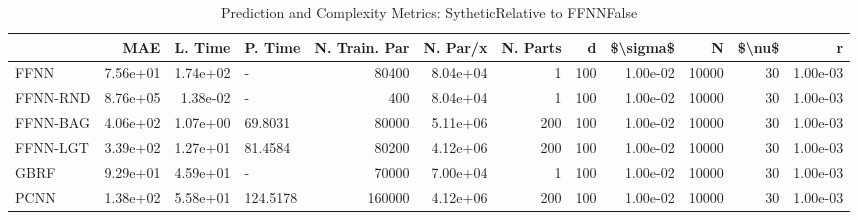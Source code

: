 \begin{table}
\centering
\caption{Prediction and Complexity Metrics: SytheticRelative to FFNNFalse}
\label{tab__Sythetic__Fix_Neurons_QTrue}
\begin{tabular}{lrrlrrrrrrrr}
\toprule
{} &      MAE &  L. Time &   P. Time &  N. Train. Par &  N. Par/x &  N. Parts &    d &  \$\textbackslash sigma\$ &      N &  \$\textbackslash nu\$ &        r \\
\midrule
FFNN     & 7.56e+01 & 1.74e+02 &         - &          80400 &  8.04e+04 &         1 &  100 &  1.00e-02 &  10000 &     30 & 1.00e-03 \\
FFNN-RND & 8.76e+05 & 1.38e-02 &         - &            400 &  8.04e+04 &         1 &  100 &  1.00e-02 &  10000 &     30 & 1.00e-03 \\
FFNN-BAG & 4.06e+02 & 1.07e+00 &   69.8031 &          80000 &  5.11e+06 &       200 &  100 &  1.00e-02 &  10000 &     30 & 1.00e-03 \\
FFNN-LGT & 3.39e+02 & 1.27e+01 &   81.4584 &          80200 &  4.12e+06 &       200 &  100 &  1.00e-02 &  10000 &     30 & 1.00e-03 \\
GBRF     & 9.29e+01 & 4.59e+01 &         - &          70000 &  7.00e+04 &         1 &  100 &  1.00e-02 &  10000 &     30 & 1.00e-03 \\
PCNN     & 1.38e+02 & 5.58e+01 &  124.5178 &         160000 &  4.12e+06 &       200 &  100 &  1.00e-02 &  10000 &     30 & 1.00e-03 \\
\bottomrule
\end{tabular}
\end{table}
